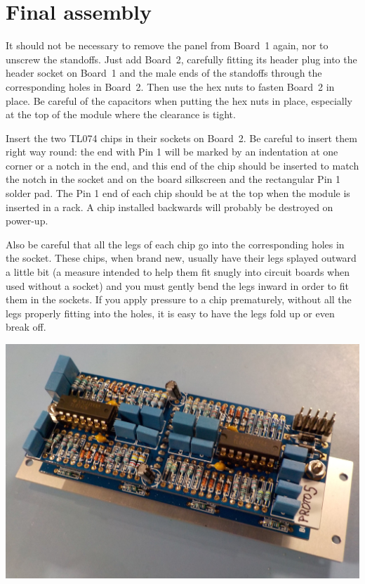 \section{Final assembly}

It should not be necessary to remove the panel from Board~1 again, nor to
unscrew the standoffs.  Just add Board~2, carefully fitting its header plug
into the header socket on Board~1 and the male ends of the standoffs through
the corresponding holes in Board~2.  Then use the hex nuts to fasten Board~2
in place.  Be careful of the capacitors when putting the hex nuts in place,
especially at the top of the module where the clearance is tight.

Insert the two TL074 chips in their sockets on Board~2.  Be careful to
insert them right way round: the end with Pin 1 will be marked by an
indentation at one corner or a notch in the end, and this end of the chip
should be inserted to match the notch in the socket and on the board
silkscreen and the rectangular Pin 1 solder pad.  The Pin 1 end of each chip
should be at the top when the module is inserted in a rack.  A chip
installed backwards will probably be destroyed on power-up.

Also be careful that all the legs of each chip go into the corresponding
holes in the socket.  These chips, when brand new, usually have their legs
splayed outward a little bit (a measure intended to help them fit snugly
into circuit boards when used without a socket) and you must gently bend the
legs inward in order to fit them in the sockets.  If you apply
pressure to a chip prematurely, without all the legs properly fitting into
the holes, it is easy to have the legs fold up or even break off.

\noindent\includegraphics[width=\linewidth]{finished-back.jpg}

